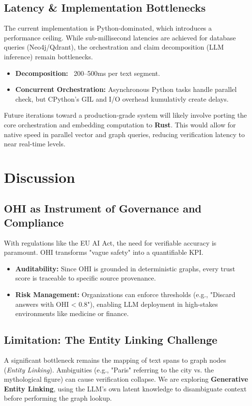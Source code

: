 \documentclass[10pt, a4paper, twocolumn]{article}
\begin{document}
\subsection{Latency \& Implementation Bottlenecks}
The current implementation is Python-dominated, which introduces a performance ceiling. While sub-millisecond latencies are achieved for database queries (Neo4j/Qdrant), the orchestration and claim decomposition (LLM inference) remain bottlenecks.
\begin{itemize}
    \item \textbf{Decomposition:} ~200--500ms per text segment.
    \item \textbf{Concurrent Orchestration:} Asynchronous Python tasks handle parallel check, but CPython's GIL and I/O overhead kumulativly create delays.
\end{itemize}
Future iterations toward a production-grade system will likely involve porting the core orchestration and embedding computation to \textbf{Rust}. This would allow for native speed in parallel vector and graph queries, reducing verification latency to near real-time levels.

\section{Discussion}

\subsection{OHI as Instrument of Governance and Compliance}
With regulations like the EU AI Act, the need for verifiable accuracy is paramount. OHI transforms "vague safety" into a quantifiable KPI.
\begin{itemize}
    \item \textbf{Auditability:} Since OHI is grounded in deterministic graphs, every trust score is traceable to specific source provenance.
    \item \textbf{Risk Management:} Organizations can enforce thresholds (e.g., "Discard answers with OHI < 0.8"), enabling LLM deployment in high-stakes environments like medicine or finance.
\end{itemize}

\subsection{Limitation: The Entity Linking Challenge}
A significant bottleneck remains the mapping of text spans to graph nodes (\textit{Entity Linking}). Ambiguities (e.g., "Paris" referring to the city vs. the mythological figure) can cause verification collapse. We are exploring \textbf{Generative Entity Linking}, using the LLM's own latent knowledge to disambiguate context before performing the graph lookup.
\end{document}
